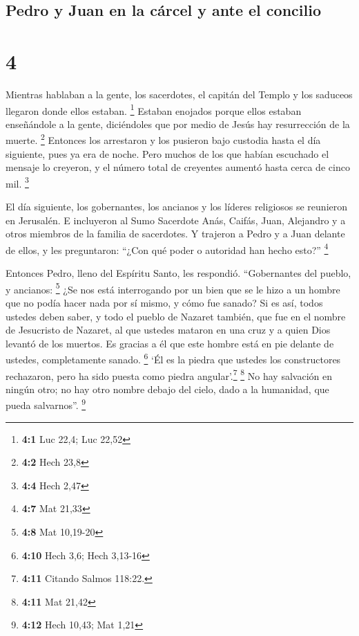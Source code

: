 \hypertarget{pedro-y-juan-en-la-cuxe1rcel-y-ante-el-concilio}{%
\subsection{Pedro y Juan en la cárcel y ante el
concilio}\label{pedro-y-juan-en-la-cuxe1rcel-y-ante-el-concilio}}

\hypertarget{section-3}{%
\section{4}\label{section-3}}

 Mientras hablaban a la gente, los sacerdotes, el capitán
del Templo y los saduceos llegaron donde ellos estaban. \footnote{\textbf{4:1}
  Luc 22,4; Luc 22,52}  Estaban enojados porque ellos
estaban enseñándole a la gente, diciéndoles que por medio de Jesús hay
resurrección de la muerte. \footnote{\textbf{4:2} Hech 23,8}
 Entonces los arrestaron y los pusieron bajo custodia
hasta el día siguiente, pues ya era de noche.  Pero muchos
de los que habían escuchado el mensaje lo creyeron, y el número total de
creyentes aumentó hasta cerca de cinco mil. \footnote{\textbf{4:4} Hech
  2,47}

 El día siguiente, los gobernantes, los ancianos y los
líderes religiosos se reunieron en Jerusalén.  E
incluyeron al Sumo Sacerdote Anás, Caifás, Juan, Alejandro y a otros
miembros de la familia de sacerdotes.  Y trajeron a Pedro
y a Juan delante de ellos, y les preguntaron: ``¿Con qué poder o
autoridad han hecho esto?'' \footnote{\textbf{4:7} Mat 21,33}

 Entonces Pedro, lleno del Espíritu Santo, les respondió.
``Gobernantes del pueblo, y ancianos: \footnote{\textbf{4:8} Mat
  10,19-20}  ¿Se nos está interrogando por un bien que se
le hizo a un hombre que no podía hacer nada por sí mismo, y cómo fue
sanado?  Si es así, todos ustedes deben saber, y todo el
pueblo de Nazaret también, que fue en el nombre de Jesucristo de
Nazaret, al que ustedes mataron en una cruz y a quien Dios levantó de
los muertos. Es gracias a él que este hombre está en pie delante de
ustedes, completamente sanado. \footnote{\textbf{4:10} Hech 3,6; Hech
  3,13-16}  `Él es la piedra que ustedes los
constructores rechazaron, pero ha sido puesta como piedra
angular'.\footnote{\textbf{4:11} Citando Salmos 118:22.} \footnote{\textbf{4:11}
  Mat 21,42}  No hay salvación en ningún otro; no hay
otro nombre debajo del cielo, dado a la humanidad, que pueda
salvarnos''. \footnote{\textbf{4:12} Hech 10,43; Mat 1,21}

